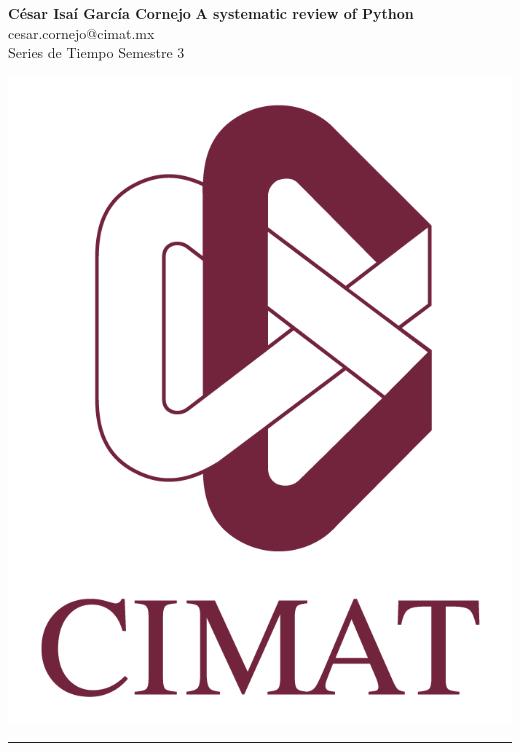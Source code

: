 \documentclass[a4paper, 11pt]{article}
\begin{document}
	\noindent
	
	\begin{minipage}[b][1.2cm][t]{0.8\textwidth}
		\large\textbf{César Isaí García Cornejo} \hfill \textbf{A systematic review of Python}  \\
		cesar.cornejo@cimat.mx \hfill \\
		\normalsize Series de Tiempo \hfill Semestre 3\\
	\end{minipage}
	
	\hspace{14.4cm}
	\begin{minipage}[b][0.03cm][t]{0.12\linewidth}
		
		\vspace{-2.2cm}
		\includegraphics[scale=0.3]{Figures/EscudoCimat.png}
	\end{minipage}
	
	\noindent\rule{7in}{2.8pt}
	
\end{document}
